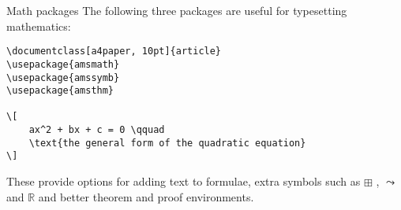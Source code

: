 \begin{frame}[fragile]{Math packages}
The following three packages are useful for typesetting mathematics:
\begin{verbatim}
\documentclass[a4paper, 10pt]{article}
\usepackage{amsmath}
\usepackage{amssymb}
\usepackage{amsthm}

\[
    ax^2 + bx + c = 0 \qquad 
    \text{the general form of the quadratic equation} 
\]

\end{verbatim}
These provide options for adding text to formulae, 
extra symbols such as \( \boxplus \) , \( \leadsto \) and \(\mathbb{R}\) and better theorem and proof environments.
\end{frame}